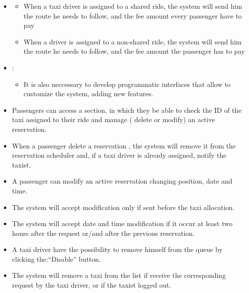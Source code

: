 \begin {itemize}
\begin{itemize}
	it will append the user in the queue corresponding to the taxi zone that include the position retrieved by the application.
	\end{itemize}
\item[G7]
	\begin{itemize}
	\item When a taxi driver is assigned to a shared ride, the system will send him the route he needs to follow, and the fee 
	amount every passenger have to pay
	\item When a driver is assigned to a non-shared ride, the system will send him the route he needs to follow, and the fee
	amount the passenger has to pay
	\end{itemize}
\item[G8]:
	\begin{itemize}
	\item  It is also neccessary to develop programmatic interfaces that allow to customize the system, adding new features.
	\end{itemize}
\end {itemize}
\begin{itemize}
 \item Passengers can access a section, in which they be able to check the ID of the taxi assigned to their ride 
 and manage ( delete or modify) an active reservation.
 \item When a passenger delete a reservation , the system will remove it from the reservation scheduler and, if a taxi 
 driver is already assigned, notify the taxist.
 \item A passenger can modify an active reservation changing position, date and time.
 \item The system will accept modification only if sent before the taxi allocation.
 \item The system will accept date and time modification if it occur at least two hours after the request or/and after the 
 previous reservation.
 \item A taxi driver have the possibility to remove himself from the queue by clicking the:``Disable'' button.
 \item The system will remove a taxi from the list if receive the corresponding request by the taxi driver, or if the taxist logged out.
\end{itemize}

